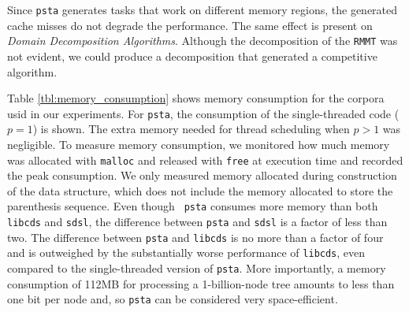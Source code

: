 Since {\tt psta} generates tasks that work on different memory
regions, the generated cache misses  do
not degrade the performance. The same effect is present on
\emph{Domain Decomposition Algorithms}. Although the decomposition of
the {\tt RMMT} was not evident, we could produce a decomposition that
generated a competitive algorithm.
%	

Table \ref{tbl:memory_consumption} shows memory consumption for the
corpora usid in our experiments.  For {\tt psta}, the consumption of
the single-threaded code ($p = 1$) is shown.  The extra memory needed
for thread scheduling when $p > 1$ was negligible.  To measure memory
consumption, we monitored how much memory was allocated with
\texttt{malloc} and released with \texttt{free} at execution time and
recorded the peak consumption.  We only measured memory allocated
during construction of the data structure, which does not include the
memory allocated to store the parenthesis sequence.  Even though {\tt
  psta} consumes more memory than both {\tt libcds} and {\tt sdsl},
the difference between {\tt psta} and {\tt sdsl} is a factor of less
than two.  The difference between {\tt psta} and {\tt libcds} is no
more than a factor of four and is outweighed by the substantially
worse performance of {\tt libcds}, even compared to the
single-threaded version of {\tt psta}.  More importantly, a memory
consumption of 112MB for processing a 1-billion-node tree amounts to
less than one bit per node and, so {\tt psta} can be considered very
space-efficient.

